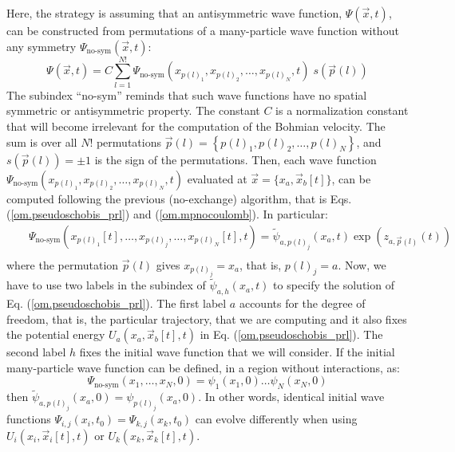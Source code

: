 \documentclass[nofootinbib, secnumarabic, amsmath, nobibnotes,10pt,aps,pra]{revtex4-1}
\newcommand{\eref}[1]{Eq. (\ref{#1})}
\begin{document}
Here, the strategy is assuming that an antisymmetric wave function,
$\Psi (\vec x,t)$, can be constructed from permutations of a
many-particle wave function without any symmetry $\Psi_\textrm{no-sym}(\vec
x,t)$:
\begin{equation}
\label{om.prl_sumexbis}
\Psi(\vec{x},{t}) = C \sum\limits_{l = 1}^{N!} \Psi_\textrm{no-sym}(x_{p(l)_1},x_{p(l)_2}, \ldots ,x_{p(l)_N},t) \; s\left( \vec{p}(l) \right)
\end{equation}
The subindex ``no-sym'' reminds that such wave functions have no
spatial symmetric or antisymmetric property. The constant $C$ is a
normalization constant that will become irrelevant for the
computation of the Bohmian velocity. The sum is over all $N!$
permutations $\vec{p}(l) = \left\{
p{{(l)}_{1}},p{{(l)}_{2}},\ldots,p{{(l)}_{N}} \right\}$, and
$s\left( \vec{p}(l) \right) = \pm 1$ is the sign of the
permutations. Then, each wave function
$\Psi_\textrm{no-sym}(x_{p(l)_1},x_{p(l)_2}, \ldots , x_{p(l)_N},t)$
evaluated at $\vec x = \{x_a,\vec x_b[t]\}$, can be computed
following the previous (no-exchange) algorithm, that is  Eqs.
(\ref{om.pseudoschobis_prl}) and (\ref{om.mpnocoulomb}). In
particular:
\begin{eqnarray}
\label{om.prl_def}
&&\Psi_\textrm{no-sym}(x_{p(l)_1}[t],\ldots , x_{p(l)_j},\ldots ,
x_{p(l)_N}[t],t) = \tilde{\psi}_{a,{p}(l)_j}(x_a,t) \exp { (z_{a,\vec{p}(l)}(t)) }\nonumber\\
\end{eqnarray}
where the permutation $\vec p(l)$ gives $x_{p(l)_j} = x_a$, that is, ${p(l)_j} = a$. Now, we have to use two labels in the subindex of $\tilde{\psi}_{a,h}(x_a,t)$ to specify the solution of \eref{om.pseudoschobis_prl}. The first label $a$ accounts for the degree of freedom, that is, the particular trajectory, that we are computing and it also fixes the potential energy $U_{a}(x_{a},\vec x_{b}[t],t)$ in \eref{om.pseudoschobis_prl}. The second label $h$ fixes the initial wave function that we will consider. If the initial many-particle wave function can be defined, in a region without interactions, as:
\begin{equation}
\label{om.prl_defini}
\Psi_\textrm{no-sym}(x_{1}, \ldots ,x_{N},0) = \psi_1(x_1,0) \ldots\psi_N(x_N,0)
\end{equation}
then $\tilde{\psi}_{a,{p}(l)_j}(x_a,0) = \psi_{p(l)_j}(x_a,0)$. In other words, identical initial wave functions $\Psi_{i,j}(x_{i},t_{0}) = \Psi_{k,j}(x_{k},t_{0})$ can evolve differently when using $U_{i}(x_{i},\vec{x}_{i}[t],t)$ or $U_{k}(x_{k},\vec{x}_{k}[t],t)$.
\end{document}
